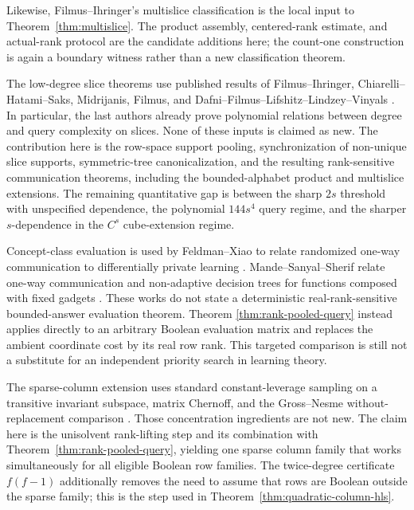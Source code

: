 \documentclass[11pt]{article}
\theoremstyle{definition}
\theoremstyle{remark}
\newcommand{\1}{\mathbf 1}
\begin{document}
Likewise, Filmus--Ihringer's multislice classification
\cite[Lemma~8.1]{FilmusIhringer} is the local input to
Theorem~\ref{thm:multislice}.  The product assembly, centered-rank estimate,
and actual-rank protocol are the candidate additions here; the count-one
construction is again a boundary witness rather than a new classification
theorem.

The low-degree slice theorems use published results of Filmus--Ihringer,
Chiarelli--Hatami--Saks, Midrijanis, Filmus, and
Dafni--Filmus--Lifshitz--Lindzey--Vinyals
\cite{FilmusIhringerJunta,ChiarelliHatamiSaks,Midrijanis,
FilmusJuntaThreshold,DafniFilmusLifshitzLindzeyVinyals}.  In particular, the
last authors already prove polynomial relations between degree and query
complexity on slices.  None of these inputs is claimed as new.  The
contribution here is the row-space support pooling, synchronization of
non-unique slice supports, symmetric-tree canonicalization, and the resulting
rank-sensitive communication theorems, including the bounded-alphabet product
and multislice extensions.  The remaining quantitative gap is
between the sharp $2s$ threshold with unspecified dependence, the polynomial
$144s^4$ query regime, and the sharper $s$-dependence in the $C^s$
cube-extension regime.

Concept-class evaluation is used by Feldman--Xiao to relate randomized
one-way communication to differentially private learning
\cite{FeldmanXiao}.  Mande--Sanyal--Sherif relate one-way communication and
non-adaptive decision trees for functions composed with fixed gadgets
\cite{MandeSanyalSherif}.  These works do not state a deterministic
real-rank-sensitive bounded-answer evaluation theorem.  Theorem
\ref{thm:rank-pooled-query} instead applies directly to an arbitrary Boolean
evaluation matrix and replaces the ambient coordinate cost by its real row
rank.  This targeted comparison is still not a substitute for an independent
priority search in learning theory.

The sparse-column extension uses standard constant-leverage sampling on a
transitive invariant subspace, matrix Chernoff, and the Gross--Nesme
without-replacement comparison \cite{Tropp,GrossNesme}.  Those concentration
ingredients are not new.  The claim here is the unisolvent rank-lifting step
and its combination with Theorem~\ref{thm:rank-pooled-query}, yielding one
sparse column family that works simultaneously for all eligible Boolean row
families.  The twice-degree certificate $f(f-1)$ additionally removes the
need to assume that rows are Boolean outside the sparse family; this is the
step used in Theorem~\ref{thm:quadratic-column-hls}.
\end{document}

